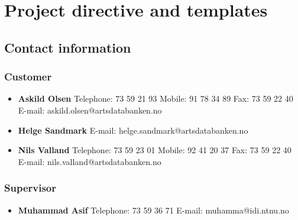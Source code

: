 \appendix

\section{Project directive and templates}
	
	\subsection{Contact information}
		\subsubsection{Customer}
			\begin{itemize}
				\item {\bf Askild Olsen} \newline
						Telephone: 73 59 21 93 \newline
						Mobile: 91 78 34 89 \newline
						Fax: 73 59 22 40 \newline
						E-mail: askild.olsen@artsdatabanken.no
				\item {\bf  Helge Sandmark} \newline
						E-mail: helge.sandmark@artsdatabanken.no
				\item {\bf Nils Valland} \newline
						Telephone: 73 59 23 01 \newline
						Mobile: 92 41 20 37 \newline
						Fax: 73 59 22 40 \newline
						E-mail: nils.valland@artsdatabanken.no
			\end{itemize}
			
		\subsubsection{Supervisor}
			\begin{itemize}
				\item {\bf Muhammad Asif} \newline
						Telephone: 73 59 36 71 \newline
						E-mail: muhamma@idi.ntnu.no
			\end{itemize}

